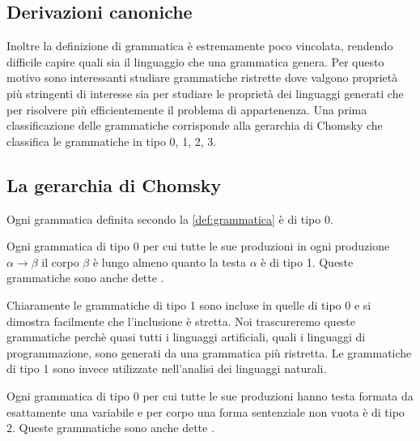 \subsection{Derivazioni canoniche}\label{sec:derivazioni-canoniche}


Inoltre la definizione di grammatica è estremamente poco vincolata, rendendo difficile capire quali sia il linguaggio
che una grammatica genera. Per questo motivo sono interessanti studiare grammatiche ristrette dove valgono proprietà più
stringenti di interesse sia per studiare le proprietà dei linguaggi generati che per risolvere più efficientemente il
problema di appartenenza.
Una prima classificazione delle grammatiche corrisponde alla gerarchia di Chomsky che classifica le grammatiche in tipo
0, 1, 2, 3.


\subsection{La gerarchia di Chomsky}\label{sec:gerarchia-chomsky}


\begin{definition}\label{def:tipo-0}
	Ogni grammatica \gramm definita secondo la \cref{def:grammatica} è di tipo 0.
\end{definition}

\begin{definition}\label{def:tipo-1}
	Ogni grammatica \gramm di tipo 0 per cui tutte le sue produzioni in ogni produzione $\alpha\to\beta$ il corpo $\beta$ è lungo almeno quanto la testa $\alpha$ è di tipo 1.
	Queste grammatiche sono anche dette .
\end{definition}

Chiaramente le grammatiche di tipo 1 sono incluse in quelle di tipo 0 e si dimostra facilmente che l'inclusione è stretta.
Noi trascureremo queste grammatiche perchè quasi tutti i linguaggi artificiali, quali i linguaggi di programmazione,
sono generati da una grammatica più ristretta.
Le grammatiche di tipo 1 sono invece utilizzate nell'analisi dei linguaggi naturali.


\begin{definition}\label{def:tipo-2}\label{def:CFG}
	Ogni grammatica \gramm di tipo 0 per cui tutte le sue produzioni hanno testa formata da esattamente una variabile e per
	corpo una forma sentenziale non vuota è di tipo 2.
	Queste grammatiche sono anche dette .
\end{definition}

